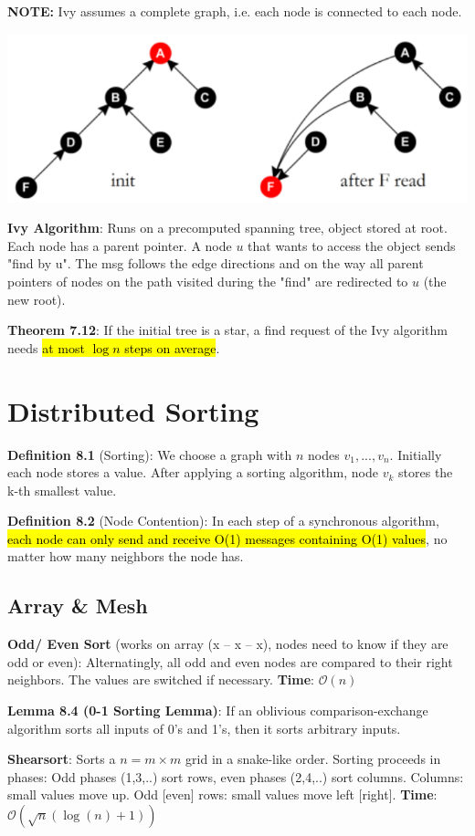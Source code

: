 \documentclass[a4paper, 8pt, landscape]{scrartcl}
\begin{document}
\begin{multicols*}{3}
\textbf{NOTE:} Ivy assumes a complete graph, i.e. each node is connected to each node.

\begin{center}
	\includegraphics[width=0.5\columnwidth]{source/ivy}
\end{center}

\textbf{Ivy Algorithm}: Runs on a precomputed spanning tree, object stored at root. Each node has a parent pointer. A node $u$ that wants to access the object sends "find by u". The msg follows the edge directions and on the way all parent pointers of nodes on the path visited during the "find" are redirected to $u$ (the new root).

\textbf{Theorem 7.12}: If the initial tree is a star, a find request of the Ivy algorithm needs \hl{at most $\log n$ steps on average}.


\section{Distributed Sorting}

\textbf{Definition 8.1} (Sorting): We choose a graph with $n$ nodes $v_1, ..., v_n$. Initially each node stores a value. After applying a sorting algorithm, node $v_k$ stores the
k-th smallest value.

\textbf{Definition 8.2} (Node Contention): In each step of a synchronous algorithm, \hl{each node can only send and receive O(1) messages containing O(1) values}, no matter how many neighbors the node has.


\subsection{Array \& Mesh}

\textbf{Odd/ Even Sort} (works on array (x – x – x), nodes need to know if they are odd or even): Alternatingly, all odd and even nodes are compared to their right neighbors. The values are switched if necessary. \textbf{Time}: $\mathcal{O}(n)$

\textbf{Lemma 8.4 (0-1 Sorting Lemma)}: If an oblivious comparison-exchange algorithm sorts all inputs of 0’s and 1’s, then it sorts arbitrary inputs.

\textbf{Shearsort}: Sorts a $n = m \times m$ grid in a snake-like order. Sorting proceeds in phases: Odd phases (1,3,..) sort rows, even phases (2,4,..) sort columns. Columns: small values move up. Odd [even] rows: small values move left [right]. \textbf{Time}: $\mathcal{O}(\sqrt{n}(\log(n) + 1))$



\end{multicols*}
\end{document}
